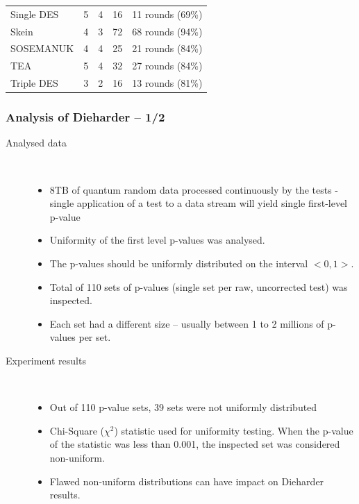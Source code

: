 \documentclass[aspectratio=169]{beamer}
\newcommand{\gr}{\cellcolor{green!40}}
\begin{document}
\begin{frame}
\begin{table}
\begin{nomar}
{\begin{tabular}{@{}lrrrr@{}}
Single DES         & \gr5               & 4                        & 16                    &    11 rounds (69\%)        \\
Skein              & \gr4               & 3                        & 72                    &    68 rounds (94\%)        \\
SOSEMANUK          &    4               & 4                        & 25                    &    21 rounds (84\%)        \\
TEA                & \gr5               & 4                        & 32                    &    27 rounds (84\%)        \\
Triple DES         & \gr3               & 2                        & 16                    &    13 rounds (81\%)        \\ \bottomrule
\end{tabular}
}
\end{nomar}
\end{table}
\end{frame}

\begin{frame}
\frametitle{Analysis of Dieharder -- 1/2}

\begin{description}
\item[Analysed data] \hfill \\
\begin{itemize}
\item 8TB of quantum random data processed continuously by the tests - single application of a test to a data stream will yield single first-level p-value
\item Uniformity of the first level p-values was analysed.
\item The p-values should be uniformly distributed on the interval $<0,1>$.
\item Total of 110 sets of p-values (single set per raw, uncorrected test) was inspected.
\item Each set had a different size -- usually between 1 to 2 millions of p-values per set.
\end{itemize}
\vspace{.2cm}
\item[Experiment results] \hfill \\
\begin{itemize}
\item Out of 110 p-value sets, 39 sets were not uniformly distributed
\item Chi-Square ($\chi^2$) statistic used for uniformity testing. When the p-value of the statistic was less than 0.001, the inspected set was considered non-uniform.
\item Flawed non-uniform distributions can have impact on Dieharder results.
\end{itemize}
\end{description}

\end{frame}
\end{document}
